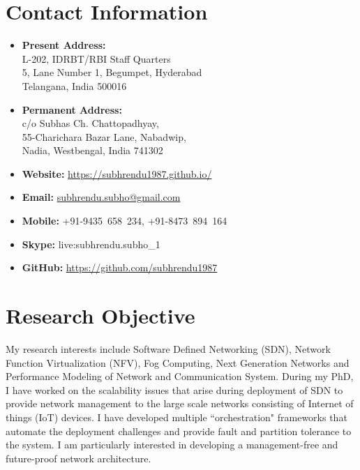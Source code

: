 \documentclass{article}
\begin{document}
 
\begin{center}
	\Large{\bf \name}
\end{center}
 \noindent\makebox[\linewidth]{\rule{\textwidth}{0.4pt}}
\section{Contact Information}
\setlength{\columnsep}{-2.5cm}

\begin{multicols}{2}
	\begin{itemize}
		 \item{\bf Present Address:}\\
		 L-202, IDRBT/RBI Staff Quarters\\
		 5, Lane Number 1, Begumpet, Hyderabad\\
		 Telangana, India 500016
		\item{\bf Permanent Address:}\\
		 c/o Subhas Ch. Chattopadhyay,\\
		 55-Charichara Bazar Lane, Nabadwip,\\
		 Nadia, Westbengal, India 741302
	\columnbreak
		\item {\bf Website:} \url{https://subhrendu1987.github.io/}
		\item {\bf Email:} \url{subhrendu.subho@gmail.com}
		\item {\bf Mobile:} +91-9435~658~234, +91-8473~894~164
		\item {\bf Skype:} live:subhrendu.subho\_1
		\item {\bf GitHub:} \url{https://github.com/subhrendu1987}
	\end{itemize}
\end{multicols}
\section{Research Objective}
	My research interests include Software Defined Networking (SDN), Network Function Virtualization (NFV), Fog Computing, Next Generation Networks and Performance Modeling of Network and Communication System. During my PhD, I have worked on the scalability issues that arise during deployment of SDN to provide network management to the large scale networks consisting of Internet of things (IoT) devices. I have developed multiple ``orchestration" frameworks that automate the deployment challenges and provide fault and partition tolerance to the system. I am particularly interested in developing a management-free and future-proof network architecture. 
\end{document}
